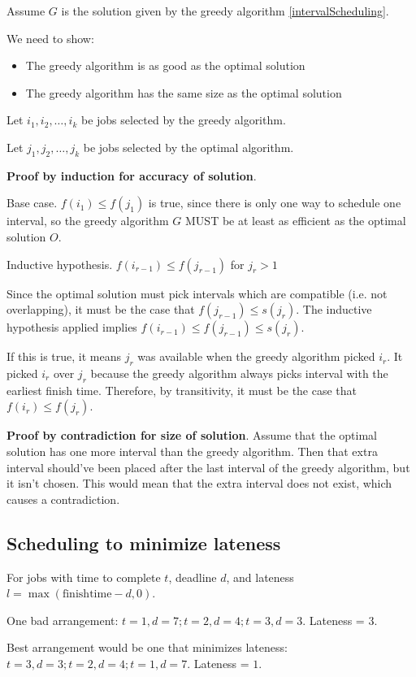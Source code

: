 \documentclass{article}
\begin{document}
Assume $G$ is the solution given by the greedy algorithm \ref{intervalScheduling}.

We need to show:
\begin{itemize}
    \item The greedy algorithm is as good as the optimal solution
    \item The greedy algorithm has the same size as the optimal solution
\end{itemize}

Let $i_1, i_2, \dots, i_k$ be jobs selected by the greedy algorithm.

Let $j_1, j_2, \dots, j_k$ be jobs selected by the optimal algorithm.

\textbf{Proof by induction for accuracy of solution}.

Base case. $f(i_1) \leq f(j_1)$ is true, since there is only one way to schedule one interval, so the greedy algorithm $G$ MUST be at least as efficient as the optimal solution $O$.

Inductive hypothesis. $f(i_{r - 1}) \leq f(j_{r - 1})$ for $j_r > 1$

Since the optimal solution must pick intervals which are compatible (i.e. not overlapping), it must be the case that $f(j_{r - 1}) \leq s(j_r)$. The inductive hypothesis applied implies $f(i_{r - 1}) \leq f(j_{r - 1}) \leq s(j_r)$.

If this is true, it means $j_r$ was available when the greedy algorithm picked $i_r$. It picked $i_r$ over $j_r$ because the greedy algorithm always picks interval with the earliest finish time. Therefore, by transitivity, it must be the case that $f(i_r) \leq f(j_r)$.

\textbf{Proof by contradiction for size of solution}. Assume that the optimal solution has one more interval than the greedy algorithm. Then that extra interval should've been placed after the last interval of the greedy algorithm, but it isn't chosen. This would mean that the extra interval does not exist, which causes a contradiction.

\subsection{Scheduling to minimize lateness}
For jobs with time to complete $t$, deadline $d$, and lateness $l = \max(\mathrm{finish time} - d, 0)$.

One bad arrangement: $t = 1, d = 7; t = 2, d = 4; t = 3, d = 3$. Lateness = $3$.

Best arrangement would be one that minimizes lateness: $t = 3, d = 3; t = 2, d = 4; t = 1, d = 7$. Lateness = $1$.
\end{document}
